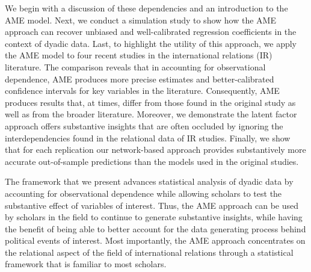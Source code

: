 We begin with a discussion of these dependencies and an introduction to the AME model. Next, we conduct a simulation study to show how the AME approach can recover unbiased and well-calibrated regression coefficients in the context of dyadic data. Last, to highlight the utility of this approach, we apply the AME model to four recent studies in the international relations (IR) literature. The comparison reveals that in accounting for observational dependence, AME produces more precise estimates and better-calibrated confidence intervals for key variables in the literature. Consequently, AME produces results that, at times, differ from those found in the original study as well as from the broader literature. Moreover, we demonstrate the latent factor approach offers substantive insights that are often occluded by ignoring the interdependencies found in the relational data of IR studies. Finally, we show that for each replication our network-based approach provides substantively more accurate out-of-sample predictions than the models used in the original studies. 

The framework that we present advances statistical analysis of dyadic data by accounting for observational dependence while allowing scholars to test the substantive effect of variables of interest. Thus, the AME approach can be used by scholars in the field to continue to generate substantive insights, while having the benefit of being able to better account for the data generating process behind political events of interest. Most importantly, the AME approach concentrates on the relational aspect of the field of international relations through a statistical framework that is familiar to most scholars.